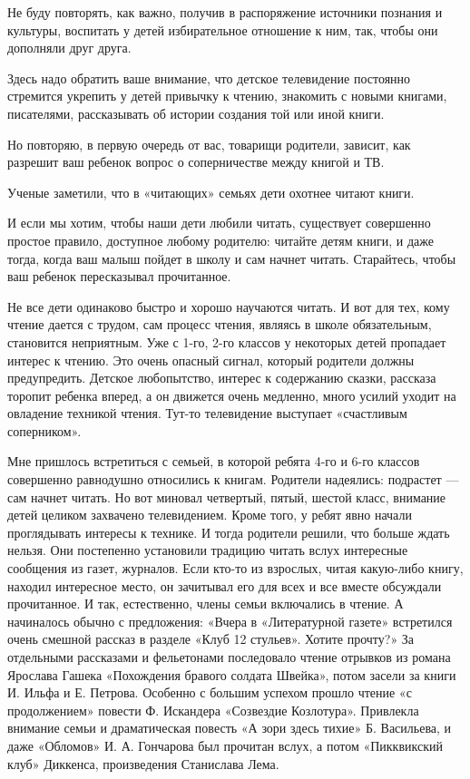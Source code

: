 \documentclass[12pt, a4paper, openany]{book}
\begin{document}
Не буду повторять, как важно, получив в распоряжение источники познания и культуры, воспитать у детей избирательное отношение к ним, так, чтобы они дополняли друг друга. 

Здесь надо обратить ваше внимание, что детское телевидение постоянно стремится укрепить у детей привычку к чтению, знакомить с новыми книгами, писателями, рассказывать об истории создания той или иной книги. 

Но повторяю, в первую очередь от вас, товарищи родители, зависит, как разрешит ваш ребенок вопрос о соперничестве между книгой и ТВ. 

Ученые заметили, что в «читающих» семьях дети охотнее читают книги. 

И если мы хотим, чтобы наши дети любили читать, существует совершенно простое правило, доступное любому родителю: читайте детям книги, и даже тогда, когда ваш малыш пойдет в школу и сам начнет читать. Старайтесь, чтобы ваш ребенок пересказывал прочитанное. 

Не все дети одинаково быстро и хорошо научаются читать. И вот для тех, кому чтение дается с трудом, сам процесс чтения, являясь в школе обязательным, становится неприятным. Уже с 1-го, 2-го классов у некоторых детей пропадает интерес к чтению. Это очень опасный сигнал, который родители должны предупредить. Детское любопытство, интерес к содержанию сказки, рассказа торопит ребенка вперед, а он движется очень медленно, много усилий уходит на овладение техникой чтения. Тут-то телевидение выступает «счастливым соперником». 

Мне пришлось встретиться с семьей, в которой ребята 4-го и 6-го классов совершенно равнодушно относились к книгам. Родители надеялись: подрастет — сам начнет читать. Но вот миновал четвертый, пятый, шестой класс, внимание детей целиком захвачено телевидением. Кроме того, у ребят явно начали проглядывать интересы к технике. И тогда родители решили, что больше ждать нельзя. Они постепенно установили традицию читать вслух интересные сообщения из газет, журналов. Если кто-то из взрослых, читая какую-либо книгу, находил интересное место, он зачитывал его для всех и все вместе обсуждали прочитанное. И так, естественно, члены семьи включались в чтение. А начиналось обычно с предложения: «Вчера в «Литературной газете» встретился очень смешной рассказ в разделе «Клуб 12 стульев». Хотите прочту?» За отдельными рассказами и фельетонами последовало чтение отрывков из романа Ярослава Гашека «Похождения бравого солдата Швейка», потом засели за книги И. Ильфа и Е. Петрова. Особенно с большим успехом прошло чтение «с продолжением» повести Ф. Искандера «Созвездие Козлотура». Привлекла внимание семьи и драматическая повесть «А зори здесь тихие» Б. Васильева, и даже «Обломов» И. А. Гончарова был прочитан вслух, а потом «Пикквикский клуб» Диккенса, произведения Станислава Лема. 
\end{document}

